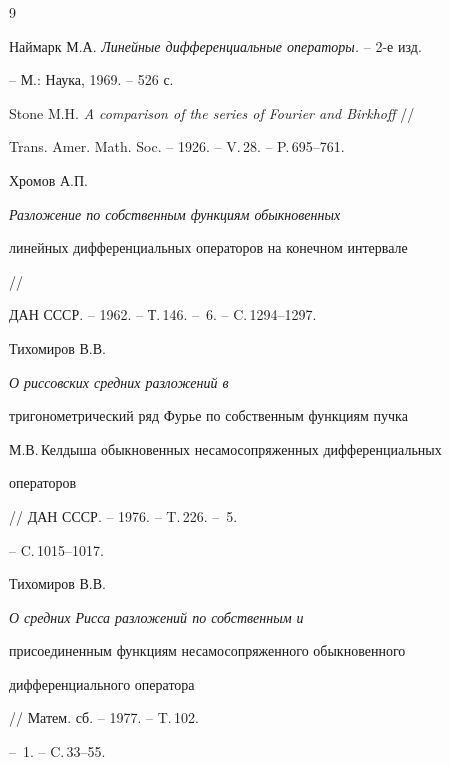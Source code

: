 \begin{thebibliography}{9}







Наймарк М.А. {\it Линейные дифференциальные операторы.} -- 2-е изд.


-- М.: Наука, 1969. -- 526 с.




Stone M.H. {\it A comparison of the series of Fourier and Birkhoff} //


Trans. Amer. Math. Soc. -- 1926. -- V.\,28. -- P.\,695--761.




Хромов А.П. {\it Разложение по собственным функциям обыкновенных


линейных дифференциальных операторов на конечном интервале} //


ДАН СССР. -- 1962. -- Т.\,146. -- \No\,6. -- C.\,1294--1297.




Тихомиров В.В. {\it О риссовских средних разложений в


тригонометрический ряд Фурье по собственным функциям пучка


М.В.\,Келдыша обыкновенных несамосопряженных дифференциальных


операторов} // ДАН СССР. -- 1976. -- T.\,226. -- \No\,5.


-- C.\,1015--1017.




Тихомиров В.В. {\it О средних Рисса разложений по собственным и


присоединенным функциям несамосопряженного обыкновенного


дифференциального оператора} // Матем. сб. -- 1977. -- T.\,102.


-- \No\,1. -- C.\,33--55.





\end{thebibliography}





\vskip 2cm












\label{end}








